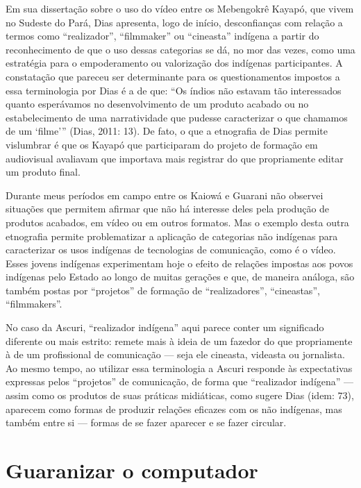 Em sua dissertação sobre o uso do vídeo entre os Mebengokrê Kayapó, que
vivem no Sudeste do Pará, Dias apresenta, logo de início, desconfianças
com relação a termos como ``realizador'', ``filmmaker'' ou ``cineasta''
indígena a partir do reconhecimento de que o uso dessas categorias se
dá, no mor das vezes, como uma estratégia para o empoderamento ou
valorização dos indígenas participantes. A constatação que pareceu ser
determinante para os questionamentos impostos a essa terminologia por
Dias é a de que: ``Os índios não estavam tão interessados quanto
esperávamos no desenvolvimento de um produto acabado ou no
estabelecimento de uma narratividade que pudesse caracterizar o que
chamamos de um ‘filme’'' (Dias, 2011: 13). De fato, o que a etnografia
de Dias permite vislumbrar é que os Kayapó que participaram do projeto
de formação em audiovisual avaliavam que importava mais registrar do
que propriamente editar um produto final.

Durante meus períodos em campo entre os Kaiowá e Guarani não observei
situações que permitem afirmar que não há interesse deles pela produção
de produtos acabados, em vídeo ou em outros formatos. Mas o exemplo
desta outra etnografia permite problematizar a aplicação de categorias
não indígenas para caracterizar os usos indígenas de tecnologias de
comunicação, como é o vídeo. Esses jovens indígenas experimentam hoje o
efeito de relações impostas aos povos indígenas pelo Estado ao longo de
muitas gerações e que, de maneira análoga, são também postas por
``projetos'' de formação de ``realizadores'', ``cineastas'', ``filmmakers''.

No caso da Ascuri, ``realizador indígena'' aqui parece conter um
significado diferente ou mais estrito: remete mais à ideia de um
fazedor do que propriamente à de um profissional de comunicação — seja
ele cineasta, videasta ou jornalista. Ao mesmo tempo, ao utilizar essa
terminologia a Ascuri responde às expectativas expressas pelos
``projetos'' de comunicação, de forma que ``realizador indígena'' — assim
como os produtos de suas práticas midiáticas, como sugere Dias (idem:
73), aparecem como formas de produzir relações eficazes com os não
indígenas, mas também entre si — formas de se fazer aparecer e se fazer
circular.


\section{Guaranizar o computador}

